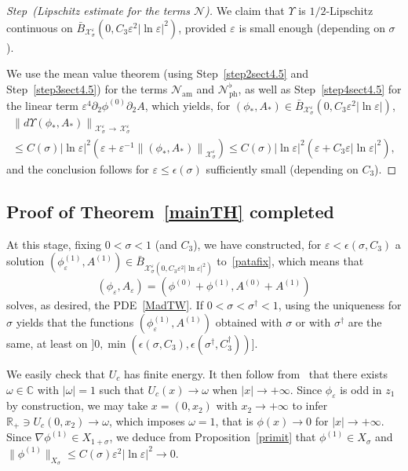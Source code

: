 \documentclass[AHL,Unicode,longabstracts,published]{cedram}
\newcommand*\p{\partial}
\newcommand*\R{\mathbb R}
\newcommand*\C{\mathbb C}
\newcommand{\amm}{\mathrm{am}}
\newcommand{\phl}{\mathrm{ph}}
\newcommand*\BN{\mathcal{N}}
\newcommand*\BX{\mathcal{X}}
\newcommand*\ii{\infty}
\newcommand*\ls{\leqslant }
\newcommand*\e{\varepsilon}
\newcommand*\ep{\epsilon}
\newcommand*\lne{\lvert \ln \varepsilon \rvert}
\newcommand*\s{\sigma}
\newcounter{stepcount}
\newenvironment{step}[1]{\refstepcounter{stepcount}\begin{proof}[{Step~\thestepcount}{\;(#1)}]}{\let\qed\relax\end{proof}}
\begin{document}
\begin{step}{{Lipschitz estimate for the terms $ \BN $}}\label{step6sect4.5}
We claim that $ \Upsilon $ is $1/2 $-Lipschitz continuous on $ \bar{B}_{\BX^{\e}_{ \s} }(0, C_3 \e^2 \lne^2) $, provided $ \e $ is small enough (depending on $ \s $).

We use the mean value theorem (using Step~\ref{step2sect4.5} and Step~\ref{step3sect4.5}) for the terms $ \BN_{\amm} $ and $ \BN_{\phl}^\flat $, as well as Step~\ref{step4sect4.5} for the linear term $ \e^4 \p_2 \phi^{(0)} \p_2 A $, which yields, for $ (\phi_*, A_*) \in \bar{B}_{\BX^{\e}_{ \s} }(0, C_3 \e^2 \lne) $,
\begin{multline*}
\left\| d \Upsilon (\phi_*, A_*)\right\|_{ \BX^\e_\s \,\to\,\BX^\e_{\s}}\\
\ls C (\s) \lne^2 \left(\e + \e^{-1} \left\| (\phi_*, A_*) \right\|_{ \BX^\e_\s } \right)
\ls C (\s) \lne^2 \left(\e + C_3 \e \lne^2 \right),
\end{multline*}
and the conclusion follows for $ \e \ls \ep (\s) $ sufficiently small (depending on $C_3 $).
\end{step}



\subsection{Proof of Theorem~\ref{mainTH} completed}\label{mainTH_complete}

At this stage, fixing $ 0 < \s < 1$ (and $ C_3 $), we have constructed, for $ \e < \ep(\s, C_3) $ a solution $ (\phi ^{(1)}_\e, A^{(1)}) \in \bar{B}_{ \BX^\e_\s (0, C_3 \e^2 \lne^2) } $ to~\eqref{patafix}, which means that
\[
(\phi_\e, A_\e) = \left(\phi^{(0)} + \phi^{(1)}, A^{(0)} + A^{(1)}\right)
\]
solves, as desired, the PDE~\eqref{MadTW}. If $ 0 < \s < \s^\dag < 1 $, using the uniqueness for $ \s $ yields that the functions $ (\phi ^{(1)}_\e, A^{(1)}) $ obtained with $ \s$ or with $ \s^\dag $ are the same, at least on $]0, \min(\ep(\s, C_3), \ep(\s^\dag, C_3 ^\dag))] $.

We easily check that $ U_c $ has finite energy. It then follow from~\cite{Gra_decay} that there exists $ \omega \in \C $ with $ \lvert \omega \rvert = 1 $ such that $ U_c(x) \to \omega $ when $ |x| \to+\ii $. Since $ \phi_\e $ is odd in $z_1 $ by construction, we may take $ x = (0,x_2) $ with $ x_2 \to+\ii $ to infer $ \R_+ \ni U_c(0, x_2) \to \omega $, which imposes $ \omega = 1 $, that is $ \phi (x) \to 0 $ for $ |x| \to +\ii $. Since $ \nabla \phi^{(1)} \in X_{1+\s} $, we deduce from Proposition~\ref{primit} that $ \phi^{(1)} \in X_\s $ and $ \| \phi^{(1)} \|_{ X_\s } \ls C(\s) \e^2 \lne^2 \to 0 $.
\end{document}

